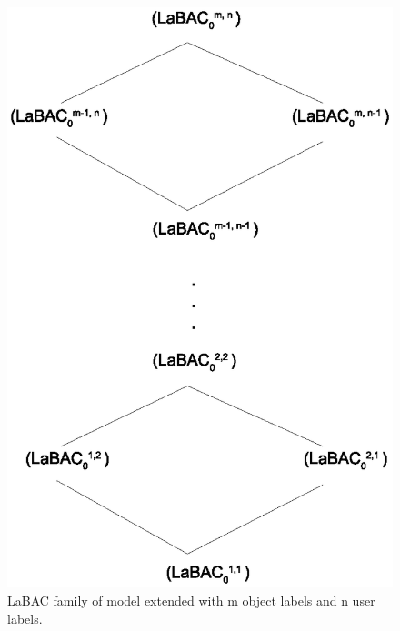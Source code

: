 	\begin{figure} 
		\centering
		\includegraphics[width=.4\textwidth]{labacmn-family}
		\caption{LaBAC family of model extended with m object labels and n user labels.}
		\label{fig:labacmn-family}
	\end{figure}